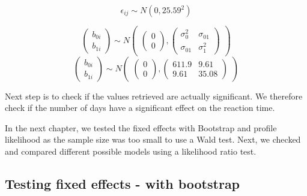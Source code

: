 \documentclass[
]{article}
\begin{document}
\[\epsilon_{ij} \sim N(0,25.59^2)\]

\[
\begin{pmatrix} b_{0i} \\ b_{1i} \end{pmatrix}
\sim N
\begin{pmatrix}
\begin{pmatrix} 0 \\ 0 \end{pmatrix},
\begin{pmatrix}
\sigma_{0}^2 & \sigma_{01} \\
\sigma_{01} & \sigma_{1}^2 
\end{pmatrix}
\end{pmatrix}
\] \[
\begin{pmatrix} b_{0i} \\ b_{1i} \end{pmatrix}
\sim N
\begin{pmatrix}
\begin{pmatrix} 0 \\ 0 \end{pmatrix},
\begin{pmatrix}
611.9 & 9.61 \\
9.61 & 35.08 
\end{pmatrix}
\end{pmatrix}
\]

Next step is to check if the values retrieved are actually significant.
We therefore check if the number of days have a significant effect on
the reaction time.

In the next chapter, we tested the fixed effects with Bootstrap and
profile likelihood as the sample size was too small to use a Wald test.
Next, we checked and compared different possible models using a
likelihood ratio test.

\hypertarget{testing-fixed-effects---with-bootstrap}{%
\subsection{Testing fixed effects - with
bootstrap}\label{testing-fixed-effects---with-bootstrap}}
\end{document}
